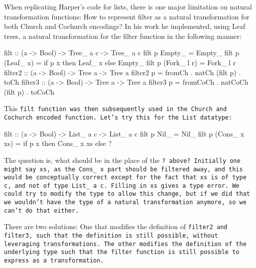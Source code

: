 When replicating Harper's code for lists, there is one major limitation on natural transformation functions:
How to represent filter as a natural transformation for both Church and Cochurch encodings?
In his work he implemented, using Leaf trees, a natural transformation for the filter function in the following manner:
\begin{spec}
filt :: (a -> Bool) -> Tree_ a c -> Tree_ a c
filt p Empty_ = Empty_
filt p (Leaf_ x) = if p x then Leaf_ x else Empty_
filt p (Fork_ l r) = Fork_ l r
filter2 :: (a -> Bool) -> Tree a -> Tree a
filter2 p = fromCh . natCh (filt p) . toCh
filter3 :: (a -> Bool) -> Tree a -> Tree a
filter3 p = fromCoCh . natCoCh (filt p) . toCoCh
\end{spec}
This \tt{filt} function was then subsequently used in the Church and Cochurch encoded function.
Let's try this for the \tt{List} datatype:
\begin{spec}
filt :: (a -> Bool) -> List_ a c -> List_ a c
filt p Nil_ = Nil_
filt p (Cons_ x xs) = if p x then Cons_ x xs else ? 
\end{spec}
The question is, what should be in the place of the \tt{?} above?
Initially one might say \tt{xs}, as the \tt{Cons\_ x} part should be filtered away, and this would be conceptually correct except for the fact that \tt{xs} is of type \tt{c}, and not of type \tt{List\_ a c}.
Filling in \tt{xs} gives a type error.
We could try to modify the type to allow this change, but if we did that we wouldn't have the type of a natural transformation anymore, so we can't do that either.

There are two solutions:
One that modifies the definition of \tt{filter2} and \tt{filter3}, such that the definition is still possible, without leveraging transformations.
The other modifies the definition of the underlying type such that the filter function is still possible to express as a transformation.
    
